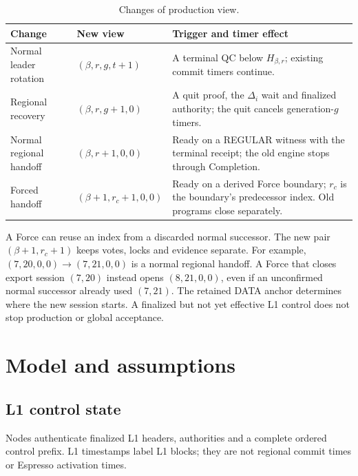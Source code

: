 \documentclass[11pt,a4paper]{article}
\begin{document}
\begin{table}[htbp]\centering\small
\caption{Changes of production view.}\label{tab:views}
\begin{tabularx}{\linewidth}{@{}>{\raggedright\arraybackslash}p{.19\linewidth}>{\raggedright\arraybackslash}p{.25\linewidth}Y@{}}\toprule
Change & New view & Trigger and timer effect\\\midrule
Normal leader rotation & $(\beta,r,g,t+1)$ & A terminal QC below $H_{\beta,r}$;
existing commit timers continue.\\
Regional recovery & $(\beta,r,g+1,0)$ & A quit proof, the $\Delta_i$ wait
and finalized authority; the quit cancels generation-$g$ timers.\\
Normal regional handoff & $(\beta,r+1,0,0)$ & Ready on a REGULAR witness
with the terminal receipt; the old engine stops through Completion.\\
Forced handoff & $(\beta+1,r_c+1,0,0)$ & Ready on a derived Force boundary;
$r_c$ is the boundary's predecessor index. Old programs close separately.\\
\bottomrule\end{tabularx}
\end{table}

A Force can reuse an index from a discarded normal successor.
The new pair $(\beta+1,r_c+1)$ keeps votes, locks and evidence separate.
For example, $(7,20,0,0)\to(7,21,0,0)$ is a normal regional
handoff. A Force that closes export session $(7,20)$ instead opens
$(8,21,0,0)$, even if an unconfirmed normal successor already used
$(7,21)$. The retained DATA anchor determines where the new session starts.
A finalized but not yet effective L1 control does not stop production
or global acceptance.

\section{Model and assumptions}
\label{sec:model}
\subsection{L1 control state}
\label{sec:l1}
Nodes authenticate finalized L1 headers, authorities and a complete
ordered control prefix. L1 timestamps label L1 blocks; they are not
regional commit times or Espresso activation times.
\end{document}
